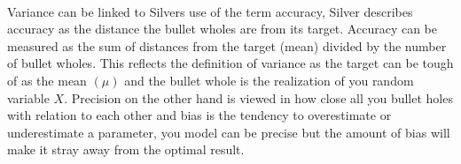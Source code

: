 \documentclass[12pt]{article}
\begin{document}
\begin{enumerate}
\\Variance can be linked to Silvers use of the term accuracy, Silver describes accuracy as the distance the bullet wholes are from its target. Accuracy can be measured as the sum of distances from the target (mean) divided by the number of bullet wholes. This reflects the definition of variance as the target can be tough of as the mean $(\mu)$ and the bullet whole is the realization of you random variable $X$.  Precision on the other hand is viewed in how close all you bullet holes with relation to each other and bias is the tendency to overestimate or underestimate a parameter, you model can be precise but the amount of bias will make it stray away from the optimal result. 
\end{enumerate}


\end{document}
